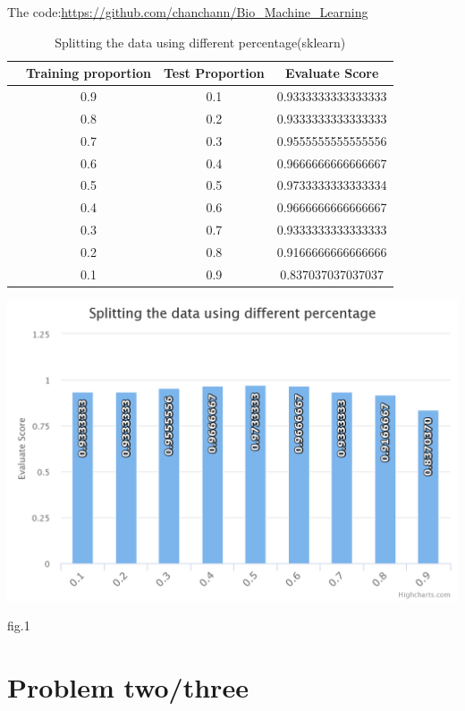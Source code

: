 \documentclass[a4pper,11pt,onecolumn]{article}
\begin{document}
The code:\url{https://github.com/chanchann/Bio_Machine_Learning}

\begin{table}[h]  %
	\centering  %
	\caption{Splitting the data using different percentage(sklearn)}  %
	\begin{tabular}{cccc}  %
		\hline
		\hline
		& Training proportion & Test Proportion & Evaluate Score \\ [0.5ex] 
		\hline
		 & 0.9 & 0.1 & 0.9333333333333333  \\
		 & 0.8 & 0.2 & 0.9333333333333333 \\
		 & 0.7 & 0.3 & 0.9555555555555556 \\
		 & 0.6 & 0.4 & 0.9666666666666667 \\
		 & 0.5 & 0.5 & 0.9733333333333334 \\
		 & 0.4 & 0.6 & 0.9666666666666667\\
		 & 0.3 & 0.7 & 0.9333333333333333 \\
		 & 0.2 & 0.8 & 0.9166666666666666 \\
		 & 0.1 & 0.9 & 0.837037037037037 \\
		\hline
		\hline
	\end{tabular}
\end{table}



\includegraphics[width=\linewidth]{split.png}
\centerline{fig.1}

\section{Problem two/three}
\end{document}
